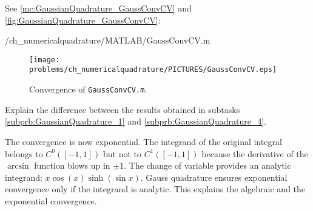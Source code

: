 \begin{problem}
\begin{subproblem}[3]
\begin{solution}
See \autoref{mc:GaussianQuadrature_GaussConvCV} and \autoref{fig:GaussianQuadrature_GaussConvCV}:

{\problems/ch_numericalquadrature/MATLAB/GaussConvCV.m}
\begin{figure}
\centering
\texttt{[image: \\problems/ch\_numericalquadrature/PICTURES/GaussConvCV.eps]}
\caption{Convergence of \texttt{GaussConvCV.m}.}
\label{fig:GaussianQuadrature_GaussConvCV}
\end{figure}
\end{solution}
\end{subproblem}

\begin{subproblem}[3] \label{subprb:GaussianQuadrature_5}
Explain the difference between the results obtained in subtasks \ref{subprb:GaussianQuadrature_1} and \ref{subprb:GaussianQuadrature_4}.

\begin{solution}
The convergence is now exponential.
The integrand of the original integral belongs to $C^0([-1,1])$ but not to $C^1([-1,1])$ because the derivative of the $\arcsin$ function blows up in $\pm1$.
The change of variable provides an analytic integrand: $x\cos(x)\sinh(\sin x)$.
Gauss quadrature ensures exponential convergence only if the integrand is analytic.
This explains the algebraic and the exponential convergence.
\end{solution}
\end{subproblem}

\end{problem}
